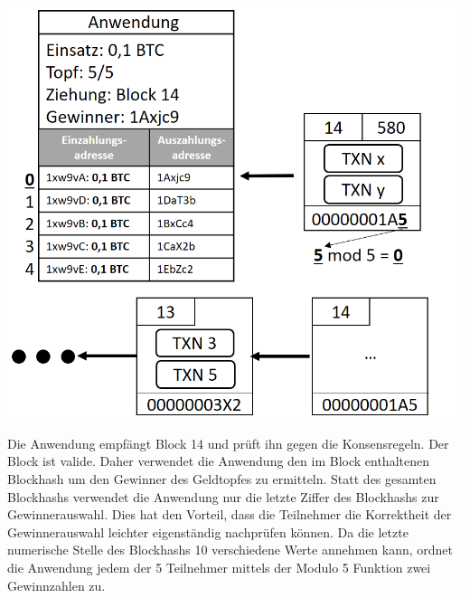 \vspace{1cm}
\begin{minipage}{0.55\textwidth}
\includegraphics[width=\textwidth]{Figures/konzept_btc/konzept10}
\centering
\decoRule
{}
\label{fig:konzept10}
\end{minipage}
\begin{minipage}{0.45\textwidth}
Die Anwendung empfängt Block 14 und prüft ihn gegen die Konsensregeln. Der Block ist valide. Daher verwendet die Anwendung den im Block enthaltenen Blockhash um den Gewinner des Geldtopfes zu ermitteln. Statt des gesamten Blockhashs verwendet die Anwendung nur die letzte Ziffer des Blockhashs zur Gewinnerauswahl. Dies hat den Vorteil, dass die Teilnehmer die Korrektheit der Gewinnerauswahl leichter eigenständig nachprüfen können.
Da die letzte numerische Stelle des Blockhashs 10 verschiedene Werte annehmen kann, ordnet die Anwendung jedem der 5 Teilnehmer mittels der Modulo 5 Funktion zwei Gewinnzahlen zu.
\end{minipage}

